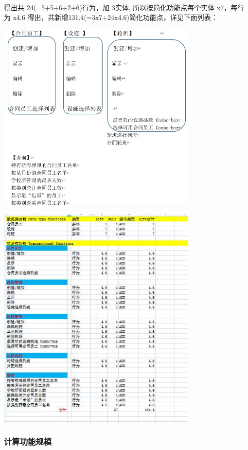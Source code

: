 得出共 24(=5+5+6+2+6)行为，加 3实体, 所以按简化功能点每个实体 x7，每行为
x4.6 得出，共新增131.4(=3x7+24x4.6)简化功能点，详见下面列表：



\includegraphics[width=10cm]{Ex1SoluScreenshot_2022-04-05_115926.jpg}


\includegraphics[width=10cm]{微信截图_20220412130822.jpg}

\hypertarget{ux8ba1ux7b97ux529fux80fdux89c4ux6a21}{%
\subsubsection{计算功能规模}\label{ux8ba1ux7b97ux529fux80fdux89c4ux6a21}}

